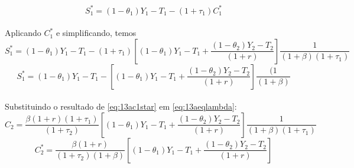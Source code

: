 \documentclass{article}
\begin{document}
\begin{equation}
    S_1^*=(1-\theta_1)Y_1-T_1-(1+\tau_1)C_1^*
\end{equation}
\\
Aplicando $C_1^*$ e simplificando, temos
\begin{equation}
    S_1^*=(1-\theta_1)Y_1-T_1-(1+\tau_1)\left[(1-\theta_1)Y_1-T_1+\frac{(1-\theta_2)Y_2-T_2}{(1+r)}\right]\frac{1}{(1+\beta)(1+\tau_1)}
\end{equation}
\begin{equation}
    S_1^*=(1-\theta_1)Y_1-T_1-\left[(1-\theta_1)Y_1-T_1+\frac{(1-\theta_2)Y_2-T_2}{(1+r)}\right]\frac{(1}{(1+\beta)}
\end{equation}
\\
Substituindo o resultado de \eqref{eq:13ac1star} em \eqref{eq:13aeqlambda}:
\begin{equation}
    C_2=\frac{\beta(1+r)(1+\tau_1)}{(1+\tau_2)}\left[(1-\theta_1)Y_1-T_1+\frac{(1-\theta_2)Y_2-T_2}{(1+r)}\right]\frac{1}{(1+\beta)(1+\tau_1)}
\end{equation}
\begin{equation}
    C_2^*=\frac{\beta(1+r)}{(1+\tau_2)(1+\beta)}\left[(1-\theta_1)Y_1-T_1+\frac{(1-\theta_2)Y_2-T_2}{(1+r)}\right]
\end{equation}
\end{document}
